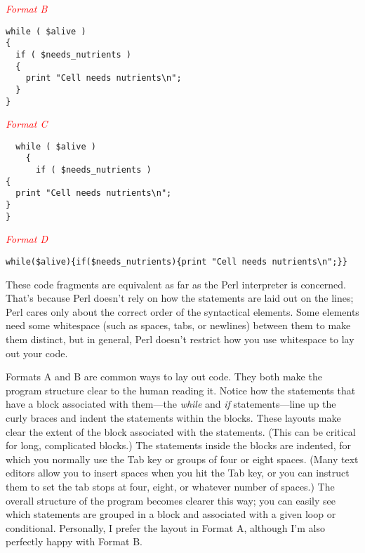 \textcolor{red}{\textit{Format B}}
\begin{adjustwidth}{1cm}{}
\begin{lstlisting}
while ( $alive )
{
  if ( $needs_nutrients )
  {
    print "Cell needs nutrients\n";
  }
}
\end{lstlisting}
\end{adjustwidth}

\textcolor{red}{\textit{Format C}}
\begin{adjustwidth}{1cm}{}
\begin{lstlisting}
  while ( $alive )
    {
      if ( $needs_nutrients )
{
  print "Cell needs nutrients\n";
}
}
\end{lstlisting}
\end{adjustwidth}

\textcolor{red}{\textit{Format D}}
\begin{adjustwidth}{1cm}{}
\begin{lstlisting}
while($alive){if($needs_nutrients){print "Cell needs nutrients\n";}}
\end{lstlisting}
\end{adjustwidth}

These code fragments are equivalent as far as the Perl interpreter is concerned. That's because Perl doesn't rely on how the statements are laid out on the lines; Perl cares only about the correct order of the syntactical elements. Some elements need some whitespace (such as spaces, tabs, or newlines) between them to make them distinct, but in general, Perl doesn't restrict how you use whitespace to lay out your code.

Formats A and B are common ways to lay out code. They both make the program structure clear to the human reading it. Notice how the statements that have a block associated with them—the \textit{while} and \textit{if} statements—line up the curly braces and indent the statements within the blocks. These layouts make clear the extent of the block associated with the statements. (This can be critical for long, complicated blocks.) The statements inside the blocks are indented, for which you normally use the Tab key or groups of four or eight spaces. (Many text editors allow you to insert spaces when you hit the Tab key, or you can instruct them to set the tab stops at four, eight, or whatever number of spaces.) The overall structure of the program becomes clearer this way; you can easily see which statements are grouped in a block and associated with a given loop or conditional. Personally, I prefer the layout in Format A, although I'm also perfectly happy with Format B.

